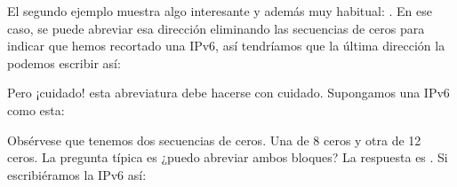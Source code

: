 \documentclass[letterpaper,10pt,spanish]{sphinxmanual}
\begin{document}
\begin{sphinxVerbatim}[commandchars=\\\{\}]
\end{sphinxVerbatim}

El segundo ejemplo muestra algo interesante y además muy habitual: . En ese caso, se puede abreviar esa dirección eliminando las secuencias de ceros  para indicar que hemos recortado una IPv6, así tendríamos que la última dirección la podemos escribir así:

\begin{sphinxVerbatim}[commandchars=\\\{\}]
  
 
\end{sphinxVerbatim}

Pero ¡cuidado! esta abreviatura debe hacerse con cuidado. Supongamos una IPv6 como esta:

\begin{sphinxVerbatim}[commandchars=\\\{\}]
\end{sphinxVerbatim}

Obsérvese que tenemos dos secuencias de ceros. Una de 8 ceros y otra de 12 ceros. La pregunta típica es ¿puedo abreviar ambos bloques? La respuesta es . Si escribiéramos la IPv6 así:

\begin{sphinxVerbatim}[commandchars=\\\{\}]
\end{sphinxVerbatim}
\end{document}
